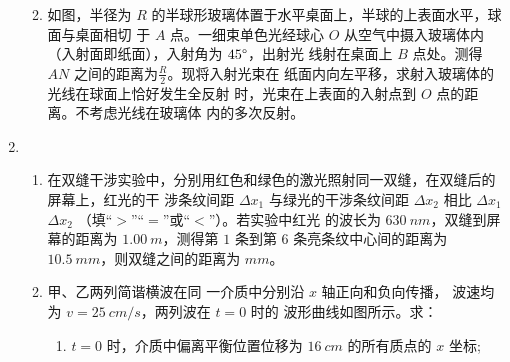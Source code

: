 \begin{enumerate}
\begin{enumerate}

\item 
如图，半径为 $ R $ 的半球形玻璃体置于水平桌面上，半球的上表面水平，球面与桌面相切
于 $ A $ 点。一细束单色光经球心 $ O $ 从空气中摄入玻璃体内（入射面即纸面），入射角为 $ 45 \degree $，出射光
线射在桌面上 $ B $ 点处。测得 $ AN $ 之间的距离为$ \frac{R}{2} $。现将入射光束在
纸面内向左平移，求射入玻璃体的光线在球面上恰好发生全反射
时，光束在上表面的入射点到 $ O $ 点的距离。不考虑光线在玻璃体
内的多次反射。
\begin{figure}[h!]
	\flushright
	
\end{figure}




\end{enumerate}


\item 
{}
\begin{enumerate}
	\item
在双缝干涉实验中，分别用红色和绿色的激光照射同一双缝，在双缝后的屏幕上，红光的干
涉条纹间距 $ \Delta x_{1} $ 与绿光的干涉条纹间距 $ \Delta x_{2} $ 相比 $ \Delta x_{1} $
 \underlinegap 
$ \Delta x_{2} $ （填“$ > $”“$ = $”或“$ < $”）。若实验中红光
的波长为 $ 630 \ nm $，双缝到屏幕的距离为 $ 1.00 \ m $，测得第 $ 1 $ 条到第 $ 6 $ 条亮条纹中心间的距离为
$ 10.5 \ mm $，则双缝之间的距离为
 \underlinegap 
$ mm $。




\item 
甲、乙两列简谐横波在同
一介质中分别沿 $ x $ 轴正向和负向传播，
波速均为 $ v=25 \ cm /s $，两列波在 $ t=0 $ 时的
波形曲线如图所示。求：
\begin{enumerate}
	\item
$ t=0 $ 时，介质中偏离平衡位置位移为 $ 16 \ cm $ 的所有质点的 $ x $ 坐标;



\end{enumerate}
\end{enumerate}
\end{enumerate}
